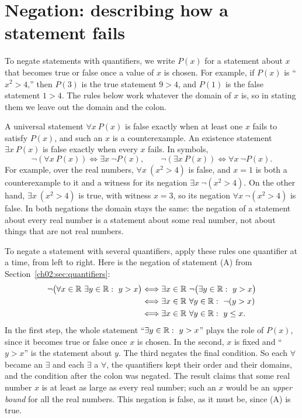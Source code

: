 \section{Negation: describing how a statement fails}\label{ch02:sec:negation}
To negate statements with quantifiers, we write $P(x)$ for a statement about $x$ that becomes true or false once a value of $x$ is chosen. For example, if $P(x)$ is ``$x^2>4$,'' then $P(3)$ is the true statement $9>4$, and $P(1)$ is the false statement $1>4$. The rules below work whatever the domain of $x$ is, so in stating them we leave out the domain and the colon.

A universal statement $\forall x\ P(x)$ is false exactly when at least one $x$ fails to satisfy $P(x)$, and such an $x$ is a counterexample. An existence statement $\exists x\ P(x)$ is false exactly when every $x$ fails. In symbols,
\[
\neg(\forall x\ P(x))\Longleftrightarrow\exists x\ \neg P(x),
\qquad
\neg(\exists x\ P(x))\Longleftrightarrow\forall x\ \neg P(x).
\]
For example, over the real numbers, $\forall x\ (x^2>4)$ is false, and $x=1$ is both a counterexample to it and a witness for its negation $\exists x\ \neg(x^2>4)$. On the other hand, $\exists x\ (x^2>4)$ is true, with witness $x=3$, so its negation $\forall x\ \neg(x^2>4)$ is false. In both negations the domain stays the same: the negation of a statement about every real number is a statement about some real number, not about things that are not real numbers.

To negate a statement with several quantifiers, apply these rules one quantifier at a time, from left to right. Here is the negation of statement (A) from Section~\ref{ch02:sec:quantifiers}:
\begin{align*}
\neg\bigl(\forall x\in\RR\ \exists y\in\RR:\ y>x\bigr)
&\Longleftrightarrow\exists x\in\RR\ \neg\bigl(\exists y\in\RR:\ y>x\bigr)\\
&\Longleftrightarrow\exists x\in\RR\ \forall y\in\RR:\ \neg(y>x)\\
&\Longleftrightarrow\exists x\in\RR\ \forall y\in\RR:\ y\le x.
\end{align*}
In the first step, the whole statement ``$\exists y\in\mathbb R:\ y>x$'' plays the role of $P(x)$, since it becomes true or false once $x$ is chosen. In the second, $x$ is fixed and ``$y>x$'' is the statement about $y$. The third negates the final condition. So each $\forall$ became an $\exists$ and each $\exists$ a $\forall$, the quantifiers kept their order and their domains, and the condition after the colon was negated. The result claims that some real number $x$ is at least as large as every real number; such an $x$ would be an \emph{upper bound} for all the real numbers. This negation is false, as it must be, since (A) is true.

